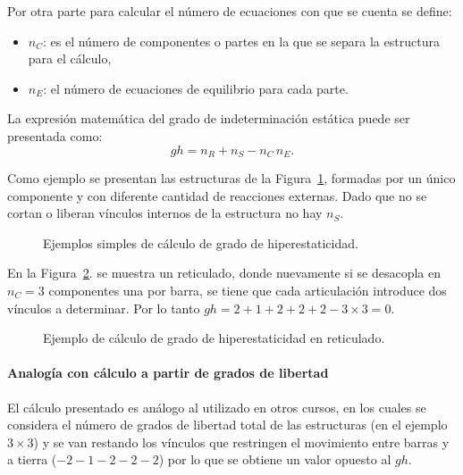 Por otra parte para calcular el número de ecuaciones con que se cuenta se define:
%
\begin{itemize}
	\item $n_C$: es el número de componentes o partes en la que se separa la estructura para el cálculo,
	\item $n_E$: el número de ecuaciones de equilibrio para cada parte.
	\end{itemize}

La expresión matemática del grado de indeterminación estática puede ser presentada como:
%
\begin{equation} \label{eqn:gradoh}
gh = n_R + n_S - n_C \, n_{E}.
\end{equation}

Como ejemplo se presentan las estructuras de la Figura~\ref{fig:ejemghSimp}, formadas por un único componente y con diferente cantidad de reacciones externas. Dado que no se cortan o liberan vínculos internos de la estructura no hay $n_S$.

\begin{figure}[htb]
\centering
 \def\svgwidth{0.95\textwidth}
  
  \caption{Ejemplos simples de cálculo de grado de hiperestaticidad.}
  \label{fig:ejemghSimp}
\end{figure}

En la Figura~\ref{fig:ejemghMed}. se muestra un reticulado, donde nuevamente si se desacopla en $n_C=3$ componentes una por barra, se tiene que cada articulación introduce dos vínculos a determinar. Por lo tanto $gh = 2+1+2+2+2-3\times 3 = 0$.

\begin{figure}[htb]
	\centering
	\def\svgwidth{0.6\textwidth}
	
	\caption{Ejemplo de cálculo de grado de hiperestaticidad en reticulado.}
	\label{fig:ejemghMed}
\end{figure}

\paragraph{Analogía con cálculo a partir de grados de libertad} %
El cálculo presentado es análogo al utilizado en otros cursos, en los cuales se considera el número de grados de libertad total de las estructuras (en el ejemplo $3\times 3$) y se van restando los vínculos que restringen el movimiento entre barras y a tierra ($-2-1-2-2-2$) por lo que se obtiene un valor opuesto al $gh$.

